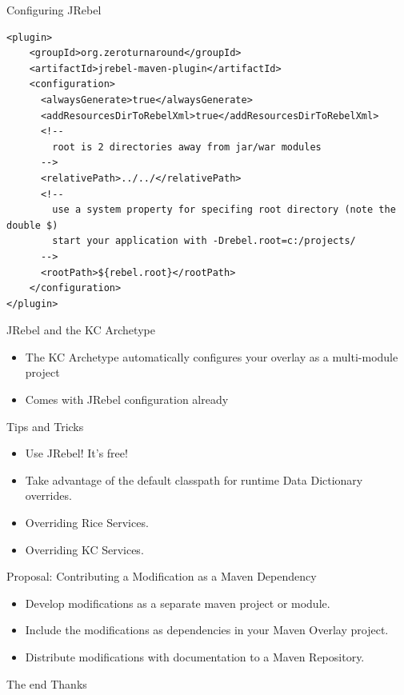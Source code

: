 \documentclass[xcolor=dvipsnames,14pt,professionalfonts]{beamer}
\begin{document}
\begin{frame}[fragile]{Configuring JRebel}
  \begin{verbatim}
<plugin>
    <groupId>org.zeroturnaround</groupId>
    <artifactId>jrebel-maven-plugin</artifactId>
    <configuration>
      <alwaysGenerate>true</alwaysGenerate>
      <addResourcesDirToRebelXml>true</addResourcesDirToRebelXml>
      <!--
        root is 2 directories away from jar/war modules
      -->
      <relativePath>../../</relativePath>
      <!--
        use a system property for specifing root directory (note the double $)
        start your application with -Drebel.root=c:/projects/
      -->
      <rootPath>${rebel.root}</rootPath>
    </configuration>
</plugin>
    \end{verbatim}
\end{frame}

\begin{frame}{JRebel and the KC Archetype}
\begin{itemize}
  \item The KC Archetype automatically configures your overlay as a multi-module project
  \item Comes with JRebel configuration already
\end{itemize}
\end{frame}

\begin{frame}[fragile]{Tips and Tricks}
  \begin{itemize}
    \item Use JRebel! It's free!
    \item Take advantage of the default classpath for runtime Data Dictionary overrides.
    \item Overriding Rice Services.
    \item Overriding KC Services.
  \end{itemize}
\end{frame}

\begin{frame}[fragile]{Proposal: Contributing a Modification as a Maven Dependency}
  \begin{itemize}
    \item Develop modifications as a separate maven project or module.
    \item Include the modifications as dependencies in your Maven Overlay project.
    \item Distribute modifications with documentation to a Maven Repository.
  \end{itemize}
\end{frame}



\begin{frame}{The end}
Thanks
\end{frame}
\end{document}
